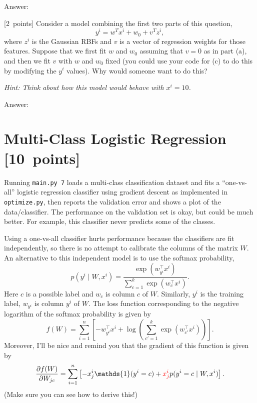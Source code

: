 \documentclass{article}
\newcommand{\ask}[1]{\textcolor{question}{#1}}
\newenvironment{answer}{\par\begingroup\color{answer}Answer: }{\endgroup}
\newcommand{\red}[1]{\textcolor{red}{#1}}
\newcommand{\pts}[1]{\textcolor{points}{[#1~points]}}
\newcommand{\hint}[1]{\textcolor{black!60!white}{\emph{Hint: #1}}}
\newcommand{\TODO}{\color{red}{TODO}}
\begin{document}
\begin{qlist}
\begin{answer}\TODO\end{answer}


\item \pts{2} Consider a model combining the first two parts of this question,
\[
y^i = w^Tx^i + w_0 + v^Tz^i,
\]
where $z^i$ is the Gaussian RBFs and $v$ is a vector of regression weights for those features. Suppose that we first fit $w$ and $w_0$ assuming that $v=0$ as in part (a), and then we fit $v$ with $w$ and $w_0$ fixed (you could use your code for (c) to do this by modifying the $y^i$ values). \ask{Why would someone want to do this?}

\hint{Think about how this model would behave with $x^i = 10$.}

\begin{answer}\TODO\end{answer}
\end{qlist}


\clearpage
\section{Multi-Class Logistic Regression \pts{10}}


Running \verb|main.py 7| loads a multi-class classification dataset and fits a ``one-vs-all'' logistic regression classifier using gradient descent as implemented in \texttt{optimize.py}, then reports the validation error and shows a plot of the data/classifier. The performance on the validation set is okay, but could be much better. For example, this classifier never  predicts some of the classes.

Using a one-vs-all classifier hurts performance because the classifiers are fit independently, so there is no attempt to calibrate the columns of the matrix $W$. An alternative to this independent model is to use the softmax probability,
\[
p(y^i \mid W, x^i) = \frac{\exp(w_{y^i}^\top x^i)}{\sum_{c=1}^k\exp(w_c^\top x^i)}.
\]
Here $c$ is a possible label and $w_{c}$ is column $c$ of $W$. Similarly, $y^i$ is the training label, $w_{y^i}$ is column $y^i$ of $W$. The loss function corresponding to the negative logarithm of the softmax probability is given by
\[
f(W) = \sum_{i=1}^n \left[-w_{y^i}^\top x^i + \log\left(\sum_{c' = 1}^k \exp(w_{c'}^\top x^i)\right)\right].
\]
Moreover, I'll be nice and remind you that the gradient of this function is given by
\[
    \frac{\partial f(W)}{\partial W_{jc}}
    = \sum_{i=1}^n \left[ -x^i_j \mathds{1}(y^i = c) + \red{x^i_j} p(y^i = c \mid W, x^i) \right]
.\]
(Make sure you can see how to derive this!)
\end{document}
